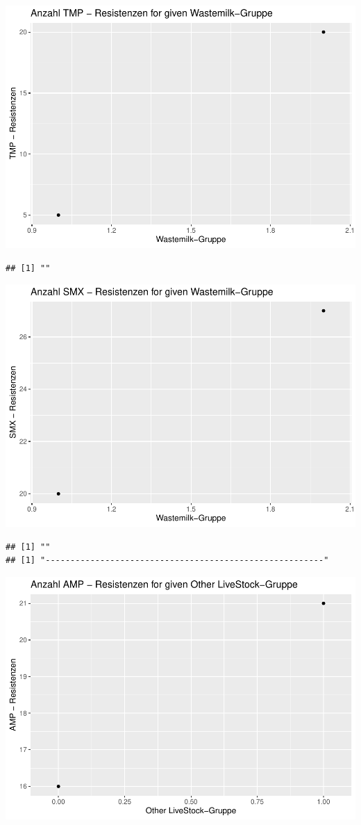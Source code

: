 \documentclass[
]{article}
\begin{document}
\includegraphics{NResistenzen_files/figure-latex/binary_or_nominal_variables-9.pdf}

\begin{verbatim}
## [1] ""
\end{verbatim}

\includegraphics{NResistenzen_files/figure-latex/binary_or_nominal_variables-10.pdf}

\begin{verbatim}
## [1] ""
## [1] "--------------------------------------------------------"
\end{verbatim}

\includegraphics{NResistenzen_files/figure-latex/binary_or_nominal_variables-11.pdf}
\end{document}
